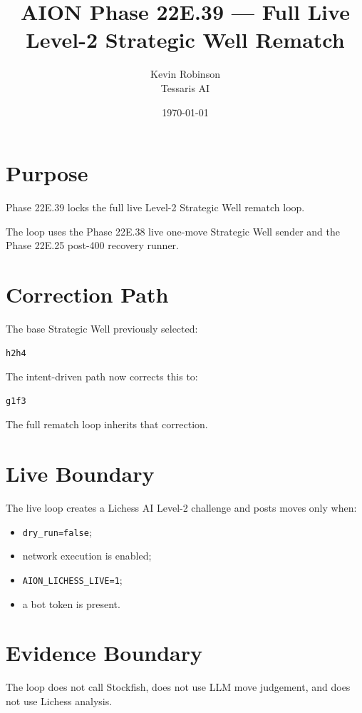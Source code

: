 \documentclass[11pt,a4paper]{article}
\title{\textbf{AION Phase 22E.39 --- Full Live Level-2 Strategic Well Rematch}}
\author{Kevin Robinson\\Tessaris AI}
\date{\today}
\begin{document}
\maketitle

\section{Purpose}

Phase 22E.39 locks the full live Level-2 Strategic Well rematch loop.

The loop uses the Phase 22E.38 live one-move Strategic Well sender and the Phase 22E.25 post-400 recovery runner.

\section{Correction Path}

The base Strategic Well previously selected:

\begin{verbatim}
h2h4
\end{verbatim}

The intent-driven path now corrects this to:

\begin{verbatim}
g1f3
\end{verbatim}

The full rematch loop inherits that correction.

\section{Live Boundary}

The live loop creates a Lichess AI Level-2 challenge and posts moves only when:

\begin{itemize}[leftmargin=*]
  \item \texttt{dry\_run=false};
  \item network execution is enabled;
  \item \texttt{AION\_LICHESS\_LIVE=1};
  \item a bot token is present.
\end{itemize}

\section{Evidence Boundary}

The loop does not call Stockfish, does not use LLM move judgement, and does not use Lichess analysis.
\end{document}
